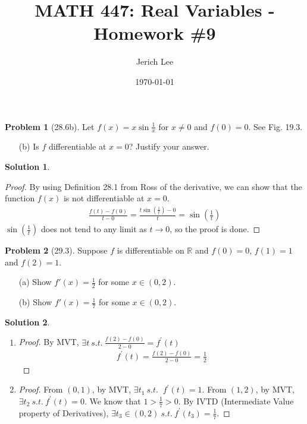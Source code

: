\documentclass[12pt]{article}
\title{MATH 447: Real Variables - Homework \#9}
\author{Jerich Lee}
\date{\today}
\theoremstyle{definition} %
\newtheorem{solution}{Solution}
\newtheorem{problem}{Problem}
\theoremstyle{plain} %
\begin{document}
\maketitle
\begin{problem}[28.6b]
    Let $ f(x) = x \sin \frac{1}{x} $ for $ x \neq 0 $ and $ f(0) = 0 $. See Fig. 19.3.

\begin{enumerate}
    \item[(b)] Is $ f $ differentiable at $ x = 0 $? Justify your answer.
\end{enumerate}
\end{problem}
\begin{solution}
    \begin{proof}
        By using Definition 28.1 from Ross of the derivative, we can show that the function $f(x)$ is not differentiable at $x=0$. 
   \begin{align}
    \frac{f(t)-f(0)}{t-0} = \frac{t\sin(\frac{1}{t})-0}{t}=\sin \left(  \frac{1}{t}\right) 
   \end{align}
   $\sin(\frac{1}{t})$ does not tend to any limit as $t\to 0$, so the proof is done.  
    \end{proof}
   \end{solution}
\begin{problem}[29.3]
    Suppose $ f $ is differentiable on $ \mathbb{R} $ and $ f(0) = 0 $, $ f(1) = 1 $ and $ f(2) = 1 $.

\begin{enumerate}
    \item[(a)] Show $ f'(x) = \frac{1}{2} $ for some $ x \in (0,2) $.
    \item[(b)] Show $ f'(x) = \frac{1}{7} $ for some $ x \in (0,2) $.
\end{enumerate}
\end{problem}
\begin{solution}
    \noindent
\begin{enumerate}
    \item \begin{proof}
            By MVT, $\exists t \ s.t. \ \frac{f(2)-f(0)}{2-0}=f^\prime (t)$
    \begin{align}
        f^\prime(t)=\frac{f(2)-f(0)}{2-0}=\frac{1}{2}
    \end{align} 
    \end{proof}
    \item \begin{proof}
        From $(0,1)$, by MVT, $\exists t_1 \ s.t. \ $ $f^\prime (t)=1$. From $(1,2)$, by MVT, $\exists t_2 \ s.t. \ f^\prime (t)=0$. We know that $1>\frac{1}{7}>0$. By IVTD (Intermediate Value property of Derivatives), $\exists t_3 \in (0,2) \ s.t. \ f^\prime (t_3)=\frac{1}{7}$.          
    \end{proof}
\end{enumerate}
\end{solution}
\end{document}
